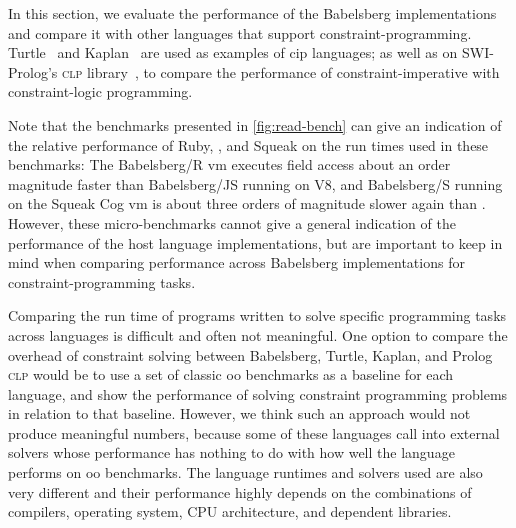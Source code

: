 In this section, we evaluate the performance of the Babelsberg implementations
and compare it with other languages that support
constraint-programming. Turtle~\cite{grabmuller2004turtle} and
Kaplan~\cite{koksal2012constraints} are used as examples of \ac{cip} languages;
as well as on SWI-Prolog's \textsc{clp}
library~\cite{Deransart:1996:prolog-standard}, to compare the performance of
constraint-imperative with constraint-logic programming.

Note that the benchmarks presented in \autoref{fig:read-bench} can give an
indication of the relative performance of Ruby, \javascript, and Squeak on the
run times used in these benchmarks: The Babelsberg/R \ac{vm} executes field
access about an order magnitude faster than Babelsberg/JS running on V8, and
Babelsberg/S running on the Squeak Cog \ac{vm} is about three orders of
magnitude slower again than \javascript. However, these micro-benchmarks cannot
give a general indication of the performance of the host language
implementations, but are important to keep in mind when comparing performance
across Babelsberg implementations for constraint-programming tasks.

Comparing the run time of programs written to solve specific programming tasks
across languages is difficult and often not meaningful. One option to compare
the overhead of constraint solving between Babelsberg, Turtle, Kaplan, and
Prolog \textsc{clp} would be to use a set of classic \ac{oo} benchmarks as a
baseline for each language, and show the performance of solving constraint
programming problems in relation to that baseline. However, we think such an
approach would not produce meaningful numbers, because some of these languages
call into external solvers whose performance has nothing to do with how well the
language performs on \ac{oo} benchmarks. The language runtimes and solvers used
are also very different and their performance highly depends on the combinations
of compilers, operating system, CPU architecture, and dependent libraries.

